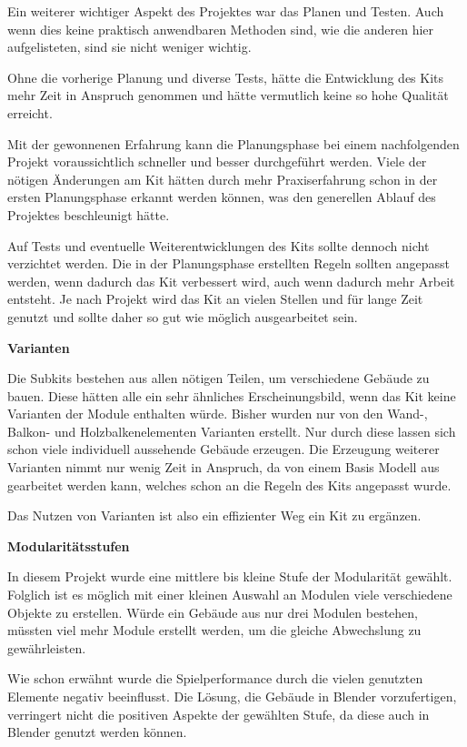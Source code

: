Ein weiterer wichtiger Aspekt des Projektes war das Planen und Testen. Auch wenn dies keine praktisch anwendbaren Methoden sind, wie die anderen hier aufgelisteten, sind sie nicht weniger wichtig.
\par
Ohne die vorherige Planung und diverse Tests, hätte die Entwicklung des Kits mehr Zeit in Anspruch genommen und hätte vermutlich keine so hohe Qualität erreicht.
\par
Mit der gewonnenen Erfahrung kann die Planungsphase bei einem nachfolgenden Projekt voraussichtlich schneller und besser durchgeführt werden. Viele der nötigen Änderungen am Kit hätten durch mehr Praxiserfahrung schon in der ersten Planungsphase erkannt werden können, was den generellen Ablauf des Projektes beschleunigt hätte.
\par
Auf Tests und eventuelle Weiterentwicklungen des Kits sollte dennoch nicht verzichtet werden. Die in der Planungsphase erstellten Regeln sollten angepasst werden, wenn dadurch das Kit verbessert wird, auch wenn dadurch mehr Arbeit entsteht. Je nach Projekt wird das Kit an vielen Stellen und für lange Zeit genutzt und sollte daher so gut wie möglich ausgearbeitet sein.
\par\textbf{Varianten}\par
Die Subkits bestehen aus allen nötigen Teilen, um verschiedene Gebäude zu bauen. Diese hätten alle ein sehr ähnliches Erscheinungsbild, wenn das Kit keine Varianten der Module enthalten würde. Bisher wurden nur von den Wand-, Balkon- und Holzbalkenelementen Varianten erstellt. Nur durch diese lassen sich schon viele individuell aussehende Gebäude erzeugen. Die Erzeugung weiterer Varianten nimmt nur wenig Zeit in Anspruch, da von einem Basis Modell aus gearbeitet werden kann, welches schon an die Regeln des Kits angepasst wurde.
\par
Das Nutzen von Varianten ist also ein effizienter Weg ein Kit zu ergänzen.
\par
\textbf{Modularitätsstufen}\par
In diesem Projekt wurde eine mittlere bis kleine Stufe der Modularität gewählt. Folglich ist es möglich mit einer kleinen Auswahl an Modulen viele verschiedene Objekte zu erstellen. Würde ein Gebäude aus nur drei Modulen bestehen, müssten viel mehr Module erstellt werden, um die gleiche Abwechslung zu gewährleisten.
\par
Wie schon erwähnt wurde die Spielperformance durch die vielen genutzten Elemente negativ beeinflusst. Die Lösung, die Gebäude in Blender vorzufertigen, verringert nicht die positiven Aspekte der gewählten Stufe, da diese auch in Blender genutzt werden können.  
